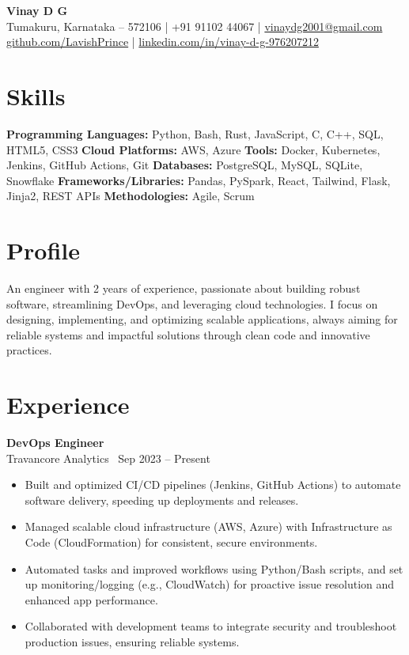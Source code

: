 \documentclass[a4paper,9pt]{article}
\begin{document}
\textbf{\Large Vinay D G} \\Tumakuru, Karnataka – 572106 \quad | \quad +91 91102 44067 \quad | \quad \href{mailto:vinaydg2001@gmail.com}{vinaydg2001@gmail.com} \\\href{https://github.com/LavishPrince}{github.com/LavishPrince} \quad | \quad \href{https://www.linkedin.com/in/vinay-d-g-976207212/}{linkedin.com/in/vinay-d-g-976207212}

\section*{Skills}
\textbf{Programming Languages:} Python, Bash, Rust, JavaScript, C, C++, SQL, HTML5, CSS3
\textbf{Cloud Platforms:} AWS, Azure
\textbf{Tools:} Docker, Kubernetes, Jenkins, GitHub Actions, Git
\textbf{Databases:} PostgreSQL, MySQL, SQLite, Snowflake
\textbf{Frameworks/Libraries:} Pandas, PySpark, React, Tailwind, Flask, Jinja2, REST APIs
\textbf{Methodologies:} Agile, Scrum

\section*{Profile}
An engineer with 2 years of experience, passionate about building robust software, streamlining DevOps, and leveraging cloud technologies. I focus on designing, implementing, and optimizing scalable applications, always aiming for reliable systems and impactful solutions through clean code and innovative practices.

\section*{Experience}
\textbf{DevOps Engineer} \\
Travancore Analytics \ \hfill Sep 2023 – Present
\begin{itemize}[leftmargin=0.25in, label=\textbullet]
    \item Built and optimized CI/CD pipelines (Jenkins, GitHub Actions) to automate software delivery, speeding up deployments and releases.
    \item Managed scalable cloud infrastructure (AWS, Azure) with Infrastructure as Code (CloudFormation) for consistent, secure environments.
    \item Automated tasks and improved workflows using Python/Bash scripts, and set up monitoring/logging (e.g., CloudWatch) for proactive issue resolution and enhanced app performance.
    \item Collaborated with development teams to integrate security and troubleshoot production issues, ensuring reliable systems.
\end{itemize}
\end{document}
